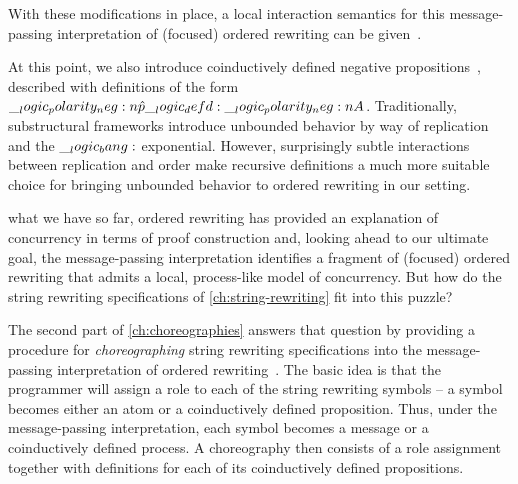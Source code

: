 
With these modifications in place, a local interaction semantics for this message-passing interpretation of (focused) ordered rewriting can be given~.

At this point, we also introduce coinductively defined negative propositions~, described with definitions of the form $\__logic_polarity_neg:n {\hat{p}} \__logic_defd: \__logic_polarity_neg:n {A}$.
Traditionally, substructural frameworks introduce unbounded behavior by way of replication and the $\__logic_bang:$ exponential.
However, surprisingly subtle interactions between replication and order make recursive definitions a much more suitable choice for bringing unbounded behavior to ordered rewriting in our setting.




 what we have so far, ordered rewriting has provided an explanation of concurrency in terms of proof construction and, looking ahead to our ultimate goal, the message-passing interpretation identifies a fragment of (focused) ordered rewriting that admits a local, process-like model of concurrency.
But how do the string rewriting specifications of \cref{ch:string-rewriting} fit into this puzzle?

The second part of \cref{ch:choreographies} answers that question by providing a procedure for \emph{choreographing} string rewriting specifications into the message-passing interpretation of ordered rewriting~.
The basic idea is that the programmer will assign a role to each of the string rewriting symbols -- a symbol becomes either an atom or a coinductively defined proposition.
Thus, under the message-passing interpretation, each symbol becomes a message or a coinductively defined process.
A choreography then consists of a role assignment together with definitions for each of its coinductively defined propositions.

